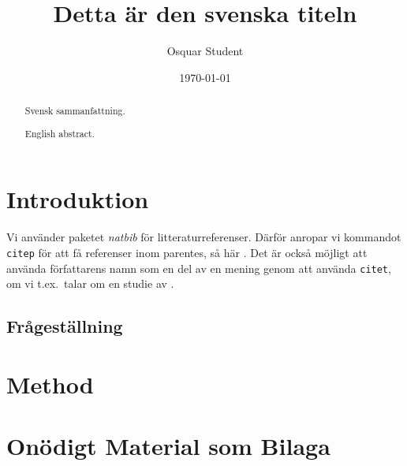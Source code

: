 \documentclass[swedish]{kththesis}
\title{Detta är den svenska titeln}
\author{Osquar Student}
\date{\today}
\begin{document}
\flyleaf

\begin{abstract}
  Svensk sammanfattning.
  \lipsum[1-2]
\end{abstract}

\clearpage

\begin{otherlanguage}{english}
  \begin{abstract}
  English abstract.
  \lipsum[3-4]
  \end{abstract}
\end{otherlanguage}

\cleardoublepage

\tableofcontents


\mainmatter


\chapter{Introduktion}

Vi använder paketet \emph{natbib} för litteraturreferenser.  Därför
anropar vi kommandot \texttt{citep} för att få referenser inom
parentes, så här \citep{heisenberg2015}.  Det är också möjligt att använda
författarens namn som en del av en mening genom att använda
\texttt{citet}, om vi t.ex.\ talar om en studie av \citet{einstein2016}.

\lipsum

\section{Frågeställning}

\lipsum[6]

\chapter{Method}

\lipsum



\appendix

\chapter{Onödigt Material som Bilaga}
\end{document}
